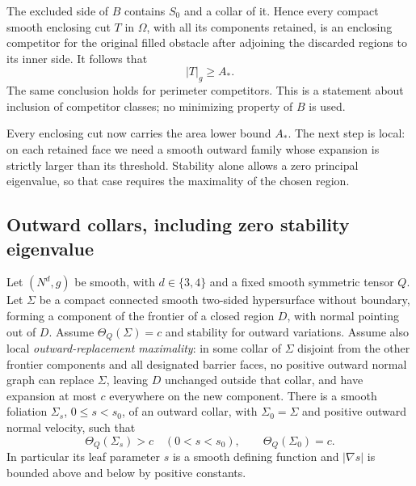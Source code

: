 The excluded side of $B$ contains $S_0$ and a collar of it.  Hence
every compact smooth enclosing cut $T$ in $\Omega$, with all its
components retained, is an enclosing competitor for the original
filled obstacle after adjoining the discarded regions to its inner
side.  It follows that
\begin{equation}\label{n3:domains:inherited-area}
 |T|_g\geq A_*.
\end{equation}
The same conclusion holds for perimeter competitors.  This is a
statement about inclusion of competitor classes; no minimizing
property of $B$ is used.

Every enclosing cut now carries the area lower bound $A_*$. The next
step is local: on each retained face we need a smooth outward family
whose expansion is strictly larger than its threshold. Stability
alone allows a zero principal eigenvalue, so that case requires the
maximality of the chosen region.

\subsection{Outward collars, including zero stability eigenvalue}

\begin{lemma}\label{n3:domains:stable-collar}
Let $(N^d,g)$ be smooth, with $d\in\{3,4\}$ and a fixed smooth
symmetric tensor $Q$.  Let $\Sigma$ be a compact connected smooth
two-sided hypersurface without boundary, forming a component of
the frontier of a closed region $D$, with normal pointing out of
$D$.  Assume $\Theta_Q(\Sigma)=c$ and
stability for outward variations.  Assume also local
\emph{outward-replacement maximality}: in some collar of $\Sigma$
disjoint from the other frontier components and all designated
barrier faces, no positive outward normal graph can replace
$\Sigma$, leaving $D$ unchanged outside that collar, and have
expansion at most $c$ everywhere on the new component.
There is a smooth foliation $\Sigma_s$, $0\leq s<s_0$, of an outward
collar, with $\Sigma_0=\Sigma$ and positive outward normal velocity,
such that
\begin{equation}\label{n3:domains:collar-expansion}
 \Theta_Q(\Sigma_s)>c\quad(0<s<s_0),\qquad
 \Theta_Q(\Sigma_0)=c.
\end{equation}
In particular its leaf parameter $s$ is a smooth defining function
and $|\nabla s|$ is bounded above and below by positive constants.
\end{lemma}

